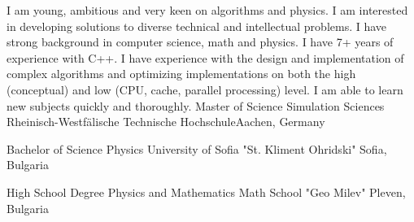 I am young, ambitious and very keen on algorithms and physics. I am interested
in developing solutions to diverse technical and intellectual
problems. I have strong background in computer science, math and physics. I
have 7+ years of experience with C++. I have experience with the design and
implementation of complex algorithms and optimizing implementations on both the
high (conceptual) and low (CPU, cache, parallel processing) level. I am able
to learn new subjects quickly and thoroughly.
{Master of Science}
{Simulation Sciences}
{Rheinisch-Westfälische Technische Hochschule}{Aachen, Germany}

{Bachelor of Science}
{Physics}
{University of Sofia "St. Kliment Ohridski"}
{Sofia, Bulgaria}

{High School Degree}
{Physics and Mathematics}
{Math School "Geo Milev"}
{Pleven, Bulgaria}



